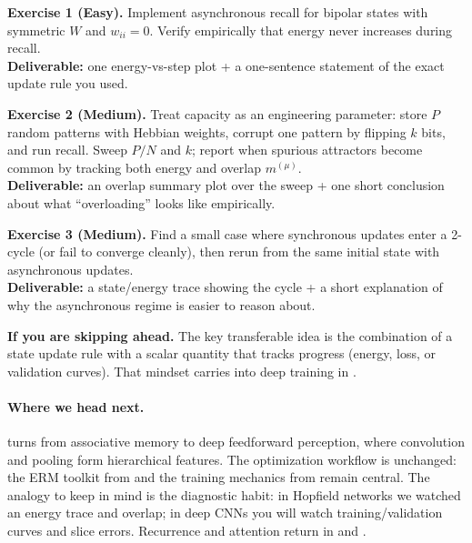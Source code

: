 \begin{tcolorbox}[summarybox, title={Exercises}]
\textbf{Exercise 1 (Easy).} Implement asynchronous recall for bipolar states with symmetric \(W\) and \(w_{ii}=0\). Verify empirically that energy never increases during recall. \\
\textbf{Deliverable:} one energy\hyp{}vs\hyp{}step plot + a one-sentence statement of the exact update rule you used.

\smallskip
\textbf{Exercise 2 (Medium).} Treat capacity as an engineering parameter: store \(P\) random patterns with Hebbian weights, corrupt one pattern by flipping \(k\) bits, and run recall. Sweep \(P/N\) and \(k\); report when spurious attractors become common by tracking both energy and overlap \(m^{(\mu)}\). \\
\textbf{Deliverable:} an overlap summary plot over the sweep + one short conclusion about what ``overloading'' looks like empirically.

\smallskip
\textbf{Exercise 3 (Medium).} Find a small case where synchronous updates enter a 2-cycle (or fail to converge cleanly), then rerun from the same initial state with asynchronous updates. \\
\textbf{Deliverable:} a state/energy trace showing the cycle + a short explanation of why the asynchronous regime is easier to reason about.

\par\medskip
\noindent\textbf{If you are skipping ahead.} The key transferable idea is the combination of a state update rule with a scalar quantity that tracks progress (energy, loss, or validation curves). That mindset carries into deep training in .
\end{tcolorbox}

\medskip
\paragraph{Where we head next.}  turns from associative memory to deep feedforward perception, where convolution and pooling form hierarchical features. The optimization workflow is unchanged: the ERM toolkit from  and the training mechanics from  remain central. The analogy to keep in mind is the diagnostic habit: in Hopfield networks we watched an energy trace and overlap; in deep CNNs you will watch training/validation curves and slice errors. Recurrence and attention return in  and .

\nocite{Hopfield1982, AmitGutfreundSompolinsky1985}
